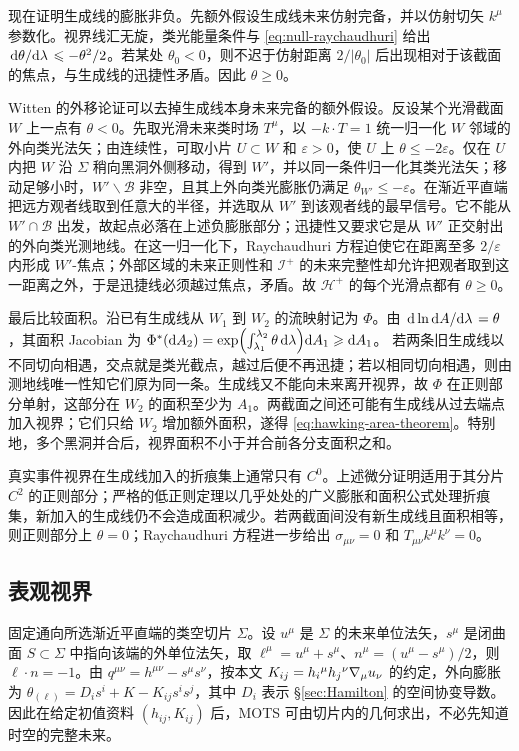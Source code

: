 现在证明生成线的膨胀非负。先额外假设生成线未来仿射完备，并以仿射切矢 $k^\mu$ 参数化。视界线汇无旋，类光能量条件与 \eqref{eq:null-raychaudhuri} 给出 $\dv*{\theta}{\lambda}\leqslant-\theta^2/2$。若某处 $\theta_0<0$，则不迟于仿射距离 $2/|\theta_0|$ 后出现相对于该截面的焦点，与生成线的迅捷性矛盾。因此 $\theta\geqslant0$。

Witten 的外移论证可以去掉生成线本身未来完备的额外假设。反设某个光滑截面 $W$ 上一点有 $\theta<0$。先取光滑未来类时场 $T^\mu$，以 $-k\cdot T=1$ 统一归一化 $W$ 邻域的外向类光法矢；由连续性，可取小片 $U\subset W$ 和 $\varepsilon>0$，使 $U$ 上 $\theta\leqslant-2\varepsilon$。仅在 $U$ 内把 $W$ 沿 $\Sigma$ 稍向黑洞外侧移动，得到 $W'$，并以同一条件归一化其类光法矢；移动足够小时，$W'\backslash\mathcal B$ 非空，且其上外向类光膨胀仍满足 $\theta_{W'}\leqslant-\varepsilon$。在渐近平直端把远方观者线取到任意大的半径，并选取从 $W'$ 到该观者线的最早信号。它不能从 $W'\cap\mathcal B$ 出发，故起点必落在上述负膨胀部分；迅捷性又要求它是从 $W'$ 正交射出的外向类光测地线。在这一归一化下，Raychaudhuri 方程迫使它在距离至多 $2/\varepsilon$ 内形成 $W'$-焦点；外部区域的未来正则性和 $\mathscr I^+$ 的未来完整性却允许把观者取到这一距离之外，于是迅捷线必须越过焦点，矛盾。故 $\mathcal H^+$ 的每个光滑点都有 $\theta\geqslant0$。

最后比较面积。沿已有生成线从 $W_1$ 到 $W_2$ 的流映射记为 $\Phi$。由 $\dv*{\ln\dd A}{\lambda}=\theta$，其面积 Jacobian 为 $\Phi^*(\dd A_2)=\exp(\int_{\lambda_1}^{\lambda_2}\theta\,\dd\lambda)\dd A_1\geqslant\dd A_1$。
若两条旧生成线以不同切向相遇，交点就是类光截点，越过后便不再迅捷；若以相同切向相遇，则由测地线唯一性知它们原为同一条。生成线又不能向未来离开视界，故 $\Phi$ 在正则部分单射，这部分在 $W_2$ 的面积至少为 $A_1$。两截面之间还可能有生成线从过去端点加入视界；它们只给 $W_2$ 增加额外面积，遂得 \eqref{eq:hawking-area-theorem}。特别地，多个黑洞并合后，视界面积不小于并合前各分支面积之和。

真实事件视界在生成线加入的折痕集上通常只有 $C^0$。上述微分证明适用于其分片 $C^2$ 的正则部分；严格的低正则定理以几乎处处的广义膨胀和面积公式处理折痕集，新加入的生成线仍不会造成面积减少。若两截面间没有新生成线且面积相等，则正则部分上 $\theta=0$；Raychaudhuri 方程进一步给出 $\sigma_{\mu\nu}=0$ 和 $T_{\mu\nu}k^\mu k^\nu=0$。

\subsection{表观视界}

固定通向所选渐近平直端的类空切片 $\Sigma$。设 $u^\mu$ 是 $\Sigma$ 的未来单位法矢，$s^\mu$ 是闭曲面 $S\subset\Sigma$ 中指向该端的外单位法矢，取 $\ell^\mu=u^\mu+s^\mu$、$n^\mu=(u^\mu-s^\mu)/2$，则 $\ell\cdot n=-1$。由 $q^{\mu\nu}=h^{\mu\nu}-s^\mu s^\nu$，按本文 $K_{ij}=h_i{}^\mu h_j{}^\nu\nabla_\mu u_\nu$ 的约定，外向膨胀为 $\theta_{(\ell)}=D_is^i+K-K_{ij}s^is^j$，其中 $D_i$ 表示 \S\ref{sec:Hamilton} 的空间协变导数。因此在给定初值资料 $(h_{ij},K_{ij})$ 后，MOTS 可由切片内的几何求出，不必先知道时空的完整未来。

